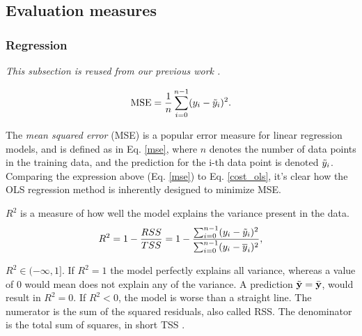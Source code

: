
\subsection{Evaluation measures}

\subsubsection{Regression}\label{sec:eval_regression}
\textit{This subsection is reused from our previous work \citep[p. 4]{project1}.}

\begin{equation}\label{mse}
    \text{MSE} = \frac{1}{n}\sum_{i=0}^{n-1}(y_i-\Tilde{y}_i)^2.
\end{equation}

The \emph{mean squared error} (MSE) is a popular error measure for linear regression models, and is defined as in Eq. \ref{mse}, where $n$ denotes the number of data points in the training data, and the prediction for the i-th data point is denoted $\Tilde{y}_i$. Comparing the expression above (Eq. \ref{mse}) to Eq. \ref{cost_ols}, it's clear how the OLS regression method is inherently designed to minimize MSE. 

$R^2$ is a measure of how well the model explains the variance present in the data. 
\begin{equation}
    R^2 = 1 - \frac{RSS}{TSS}= 1 - \frac{\sum_{i=0}^{n-1}(y_i-\Tilde{y}_i)^2}{\sum_{i=0}^{n-1}(y_i-\overline{y}_i)^2},
\end{equation}

$R^2 \in (-\infty,1]$. If $R^2 = 1$ the model perfectly explains all variance, whereas a value of 0 would mean does not explain any of the variance. 
A prediction $\tilde {\mathbf{y}} = \bar {\mathbf{y}}$, would result in $R^2 = 0$.
If $R^2<0$, the model is worse than a straight line.
The numerator is the sum of the squared residuals, also called RSS. The denominator is the total sum of squares, in short TSS \cite[p. 29]{martin}.

